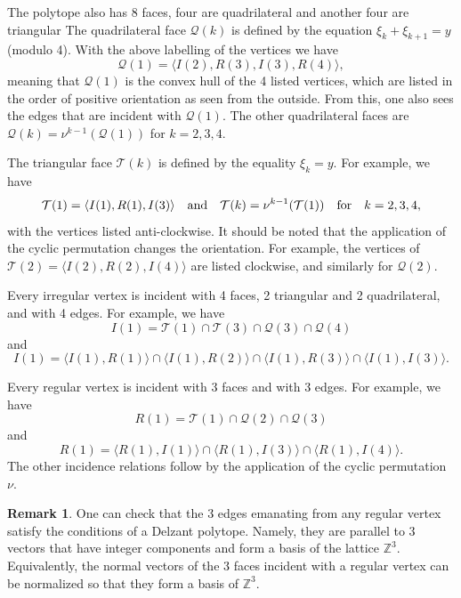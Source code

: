 \documentclass[a4paper,11pt,reqno]{amsart}
\theoremstyle{definition}
\newtheorem{rem}[thm]{Remark}
\numberwithin{equation}{section}
\newcommand{\be}{\begin{equation}}
\newcommand{\ee}{\end{equation}}
\def\bZ{{\mathbb Z}}                        %
\def\cT{{\mathcal T}}                       %
\def\cQ{{\mathcal Q}}                       %
\begin{document}
The polytope also has 8 faces,  four are quadrilateral and another four are triangular
The quadrilateral face $\cQ(k)$ is defined by the equation $\xi_k + \xi_{k+1} = y$ (modulo 4).
With the above  labelling of the vertices we have
\be
\cQ(1) = \langle I(2), R(3), I(3), R(4) \rangle,
\ee
meaning that $\cQ(1)$ is the convex hull of the 4 listed vertices, which are listed in the order
of positive orientation as seen from the outside. From this, one also sees the edges that are incident with $\cQ(1)$.
The other quadrilateral faces are $\cQ(k) = \nu^{k-1}(\cQ(1))$ for $k=2,3,4$.

The triangular face $\cT(k)$ is defined by the equality $\xi_k =y$.  For example, we have
\be
\cT(1) = \langle I(1), R(1), I(3) \rangle
\quad \hbox{and} \quad \cT(k) = \nu^{k-1}(\cT(1))
\quad
\hbox{for}\quad k=2,3,4,
\ee
with the vertices listed anti-clockwise.
It should be noted that the application of the cyclic permutation changes the orientation.
For example,  the vertices of $\cT(2) = \langle I(2), R(2), I(4) \rangle $
are listed clockwise, and similarly for $\cQ(2)$.

Every irregular vertex is incident with 4 faces, 2 triangular and 2 quadrilateral, and with 4 edges.
For example, we have
\be
I(1) =  \cT(1) \cap \cT(3) \cap \cQ(3) \cap \cQ(4)
\ee
and
\be
I(1) = \langle I(1), R(1) \rangle \cap \langle I(1), R(2) \rangle \cap \langle I(1), R(3) \rangle \cap \langle I(1), I(3) \rangle.
\ee

Every regular vertex is incident with 3 faces and with 3 edges.
For example, we have
\be
R(1) =  \cT(1) \cap \cQ(2) \cap \cQ(3)
\ee
and
\be
R(1) = \langle R(1), I(1) \rangle   \cap \langle R(1), I(3) \rangle \cap \langle R(1), I(4) \rangle .
\ee
The other incidence relations follow by the application of the cyclic permutation $\nu$.


\begin{rem}\label{rem41}
One can check that the 3 edges emanating from any regular vertex satisfy the conditions
of a Delzant polytope. Namely, they are parallel to 3 vectors that have integer components
and form a basis of the lattice $\bZ^3$. Equivalently, the normal vectors of the 3 faces incident with a regular
vertex can be  normalized so that they form a basis of $\bZ^3$.
\end{rem}
\end{document}
